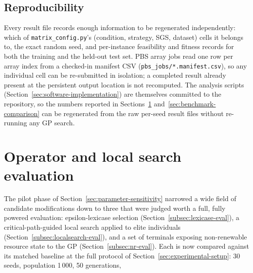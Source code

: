 \subsection{Reproducibility}
\label{subsec:reproducibility}

Every result file records enough information to be regenerated
independently: which of \texttt{matrix\_config.py}'s (condition, strategy,
SGS, dataset) cells it belongs to, the exact random seed, and per-instance
feasibility and fitness records for both the training and the held-out test
set. PBS array jobs read one row per array index from a checked-in
manifest CSV (\texttt{pbs\_jobs/*.manifest.csv}), so any individual cell can
be re-submitted in isolation; a completed result already present at the
persistent output location is not recomputed.  The analysis scripts
(Section~\ref{sec:software-implementation}) are themselves committed to the
repository, so the numbers reported in
Sections~\ref{sec:operator-evaluation} and~\ref{sec:benchmark-comparison}
can be regenerated from the raw per-seed result files without re-running any
GP search. 

\section{Operator and local search evaluation}
\label{sec:operator-evaluation}

The pilot phase of Section~\ref{sec:parameter-sensitivity} narrowed a wide
field of candidate modifications down to three that were judged worth a
full, fully powered evaluation: epsilon-lexicase selection
(Section~\ref{subsec:lexicase-eval}), a critical-path-guided 
local search applied to elite individuals
(Section~\ref{subsec:localsearch-eval}), and a set of terminals exposing
non-renewable resource state to the GP
(Section~\ref{subsec:nr-eval}). Each is now compared against its matched
baseline at the full protocol of Section~\ref{sec:experimental-setup}: 30
seeds, population 1\,000, 50 generations, 

